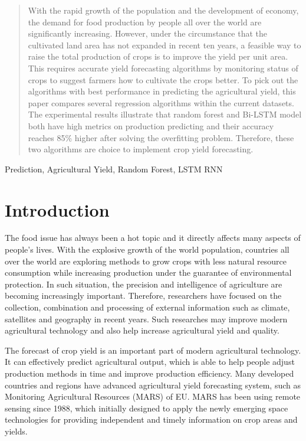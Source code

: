 \documentclass[conference]{IEEEtran}
\begin{document}
\begin{abstract}
  With the rapid growth of the population and the development of economy, the demand for food production by people all over the world are significantly increasing. However, under the circumstance that the cultivated land area has not expanded in recent ten years, a feasible way to raise the total production of crops is to improve the yield per unit area. This requires accurate yield forecasting algorithms by monitoring status of crops to suggest farmers how to cultivate the crops better. To pick out the algorithms with best performance in predicting the agricultural yield, this paper compares several regression algorithms within the current datasets. The experimental results illustrate that random forest and Bi-LSTM model both have high metrics on production predicting and their accuracy reaches 85\% higher after solving the overfitting problem. Therefore, these two algorithms are choice to implement crop yield forecasting.
\end{abstract}

\begin{IEEEkeywords}
  Prediction, Agricultural Yield, Random Forest, LSTM RNN
\end{IEEEkeywords}

\section{Introduction}
  The food issue has always been a hot topic and it directly affects many aspects of people's lives. With the explosive growth of the world population, countries all over the world are exploring methods to grow crops with less natural resource consumption while increasing production under the guarantee of environmental protection. In such situation, the precision and intelligence of agriculture are becoming increasingly important. Therefore, researchers have focused on the collection, combination and processing of external information such as climate, satellites and geography in recent years. Such researches may improve modern agricultural technology and also help increase agricultural yield and quality.

  The forecast of crop yield is an important part of modern agricultural technology. It can effectively predict agricultural output, which is able to help people adjust production methods in time and improve production efficiency. Many developed countries and regions have advanced agricultural yield forecasting system, such as Monitoring Agricultural Resources (MARS) of EU\cite{MARS}. MARS has been using remote sensing since 1988, which initially designed to apply the newly emerging space technologies for providing independent and timely information on crop areas and yields. 
  
\end{document}
